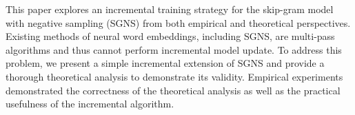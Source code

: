 This paper explores an incremental training strategy for the skip-gram model with negative sampling (SGNS) from both empirical and theoretical perspectives. Existing methods of neural word embeddings, including SGNS, are multi-pass algorithms and thus cannot perform incremental model update. To address this problem, we present a simple incremental extension of SGNS and provide a thorough theoretical analysis to demonstrate its validity. Empirical experiments demonstrated the correctness of the theoretical analysis as well as the practical usefulness of the incremental algorithm.
